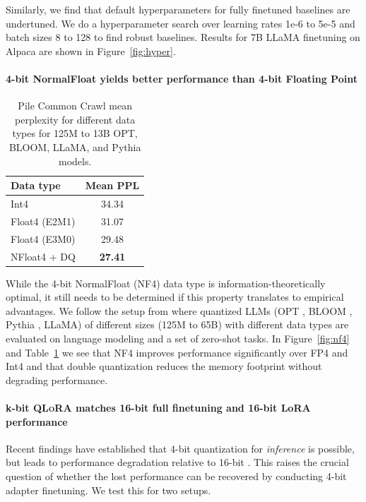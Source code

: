 \documentclass{article}
\newcommand{\method}{\textsc{QLoRA}\xspace}
\begin{document}
Similarly, we find that default hyperparameters for fully finetuned baselines are undertuned. We do a hyperparameter search over learning rates 1e-6 to 5e-5 and batch sizes 8 to 128 to find robust baselines. Results for 7B LLaMA finetuning on Alpaca are shown in Figure~\ref{fig:hyper}.


\paragraph{4-bit NormalFloat yields better performance than 4-bit Floating Point} 

\begin{table}
\centering
\caption{Pile Common Crawl mean perplexity for different data types for 125M to 13B OPT, BLOOM, LLaMA, and Pythia models. 
}
\label{tbl:nf4_ppl}
\begin{tabular}{lc}\toprule
Data type & Mean PPL \\\midrule
Int4 & 34.34 \\
Float4 (E2M1) & 31.07 \\
Float4 (E3M0) & 29.48 \\
NFloat4 + DQ & \textbf{27.41}\\\bottomrule
\end{tabular}
\end{table}


While the 4-bit NormalFloat (NF4) data type is information-theoretically optimal, it still needs to be determined if this property translates to empirical advantages. We follow the setup from \citet{dettmers2022case} where quantized LLMs (OPT \citep{zhang2022opt}, BLOOM \cite{scao2022bloom}, Pythia \cite{biderman2023pythia}, LLaMA) of different sizes (125M to 65B) with different data types are evaluated on language modeling and a set of zero-shot tasks. In Figure~\ref{fig:nf4} and Table~\ref{tbl:nf4_ppl} we see that NF4 improves performance significantly over FP4 and Int4 and that double quantization reduces the memory footprint without degrading performance.

\paragraph{k-bit \method matches 16-bit full finetuning and 16-bit LoRA performance}
Recent findings have established that 4-bit quantization for \emph{inference} is possible, but leads to performance degradation relative to 16-bit \citep{dettmers2022case,frantar2022gptq}. This raises the crucial question of whether the lost performance can be recovered by conducting 4-bit adapter finetuning. We test this for two setups. 
\end{document}
